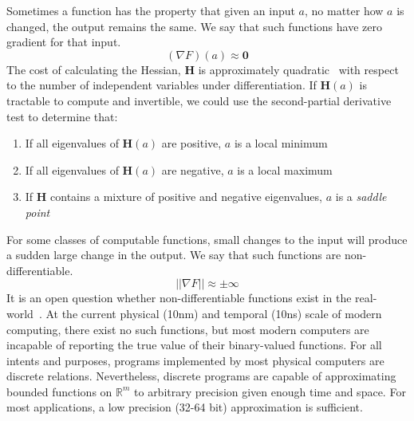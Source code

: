 \noindent Sometimes a function has the property that given an input $a$, no matter how $a$ is changed, the output remains the same. We say that such functions have zero gradient for that input.
%
\begin{equation}
    (\nabla F)(a) \approx \mathbf{0}
\end{equation}
%
The cost of calculating the Hessian, $\mathbf{H}$ is approximately quadratic~\citep{griewank1993some} with respect to the number of independent variables under differentiation. If $\mathbf{H}(a)$ is tractable to compute and invertible, we could use the second-partial derivative test to determine that:\\
%
\begin{enumerate}
    \item If all eigenvalues of $\mathbf{H}(a)$ are positive, $a$ is a local minimum
    \item If all eigenvalues of $\mathbf{H}(a)$ are negative, $a$ is a local maximum
    \item If $\mathbf{H}$ contains a mixture of positive and negative eigenvalues, $a$ is a \textit{saddle point}\\
\end{enumerate}
%
For some classes of computable functions, small changes to the input will produce a sudden large change in the output. We say that such functions are non-differentiable.
%
\begin{equation}
    ||\nabla F|| \approx \pm \infty
\end{equation}
%
It is an open question whether non-differentiable functions exist in the real-world~\citep{buniy2005hilbert}. At the current physical (10nm) and temporal (10ns) scale of modern computing, there exist no such functions, but most modern computers are incapable of reporting the true value of their binary-valued functions. For all intents and purposes, programs implemented by most physical computers are discrete relations. Nevertheless, discrete programs are capable of approximating bounded functions on $\mathbb{R}^m$ to arbitrary precision given enough time and space. For most applications, a low precision (32-64 bit) approximation is sufficient.

